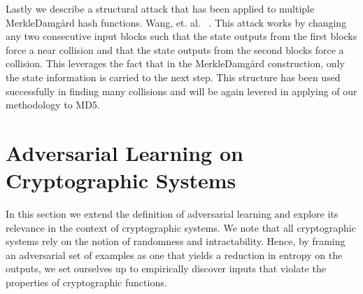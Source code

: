 Lastly we describe a structural attack that has been applied to multiple Merkle{\textendash}Damg\r{a}rd hash functions. Wang, et. al. ~\cite{wang2005break}. This attack works by changing any two consecutive input blocks such that the state outputs from the first blocks force a near collision and that the state outputs from the second blocks force a collision. This leverages the fact that in the Merkle{\textendash}Damg\r{a}rd construction, only the state information is carried to the next step. This structure has been used successfully in finding many collisions and will be again levered in applying of our methodology to MD5. 

\section{Adversarial Learning on Cryptographic Systems}

In this section we extend the definition of adversarial learning and explore its relevance in the context of cryptographic systems. We note that all cryptographic systems rely on the notion of randomness and intractability. Hence, by framing an adversarial set of examples as one that yields a reduction in entropy on the outputs, we set ourselves up to empirically discover inputs that violate the properties of cryptographic functions. 

